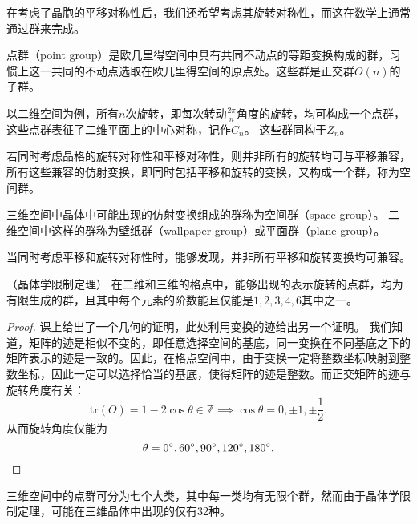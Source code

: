 在考虑了晶胞的平移对称性后，我们还希望考虑其旋转对称性，而这在数学上通常通过群来完成。

\begin{definition}
    点群（point group）是欧几里得空间中具有共同不动点的等距变换构成的群，习惯上这一共同的不动点选取在欧几里得空间的原点处。这些群是正交群$O(n)$的子群。
\end{definition}

以二维空间为例，所有$n$次旋转，即每次转动$\frac{2\pi}{n}$角度的旋转，均可构成一个点群，这些点群表征了二维平面上的中心对称，记作$C_n$。
这些群同构于$Z_n$。

若同时考虑晶格的旋转对称性和平移对称性，则并非所有的旋转均可与平移兼容，所有这些兼容的仿射变换，即同时包括平移和旋转的变换，又构成一个群，称为空间群。

\begin{definition}
    三维空间中晶体中可能出现的仿射变换组成的群称为空间群（space group）。
    二维空间中这样的群称为壁纸群（wallpaper group）或平面群（plane group）。
\end{definition}

当同时考虑平移和旋转对称性时，能够发现，并非所有平移和旋转变换均可兼容。

\begin{theorem}
    （晶体学限制定理）
    在二维和三维的格点中，能够出现的表示旋转的点群，均为有限生成的群，且其中每个元素的阶数能且仅能是$1,2,3,4,6$其中之一。
\end{theorem}

\begin{proof}
    课上给出了一个几何的证明，此处利用变换的迹给出另一个证明。
    我们知道，矩阵的迹是相似不变的，即任意选择空间的基底，同一变换在不同基底之下的矩阵表示的迹是一致的。因此，在格点空间中，由于变换一定将整数坐标映射到整数坐标，因此一定可以选择恰当的基底，使得矩阵的迹是整数。而正交矩阵的迹与旋转角度有关：
    \begin{equation}\mathrm{tr}(O) = 1 - 2 \cos \theta \in \mathbb Z \implies \cos \theta = 0, \pm 1, \pm \frac{1}{2}.\end{equation}
    从而旋转角度仅能为
    \begin{equation}\theta = 0^\circ, 60^\circ, 90^\circ, 120^\circ, 180^\circ. \qedhere\end{equation}
\end{proof}

三维空间中的点群可分为七个大类，其中每一类均有无限个群，然而由于晶体学限制定理，可能在三维晶体中出现的仅有32种。

